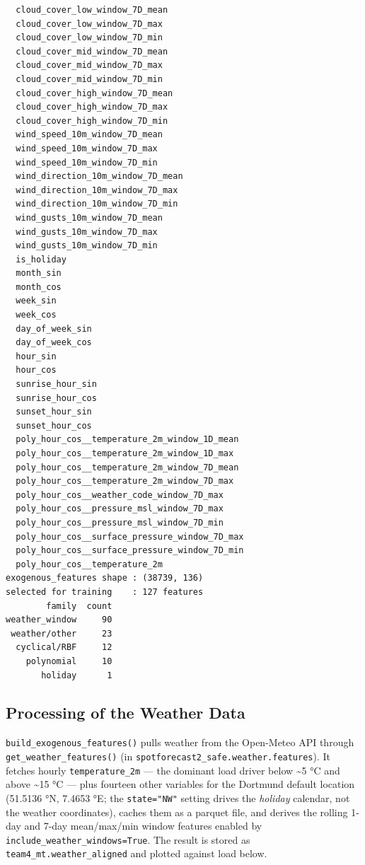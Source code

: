 \documentclass[
  english,
  letterpaper,
]{scrbook}
\begin{document}
\begin{verbatim}
  cloud_cover_low_window_7D_mean
  cloud_cover_low_window_7D_max
  cloud_cover_low_window_7D_min
  cloud_cover_mid_window_7D_mean
  cloud_cover_mid_window_7D_max
  cloud_cover_mid_window_7D_min
  cloud_cover_high_window_7D_mean
  cloud_cover_high_window_7D_max
  cloud_cover_high_window_7D_min
  wind_speed_10m_window_7D_mean
  wind_speed_10m_window_7D_max
  wind_speed_10m_window_7D_min
  wind_direction_10m_window_7D_mean
  wind_direction_10m_window_7D_max
  wind_direction_10m_window_7D_min
  wind_gusts_10m_window_7D_mean
  wind_gusts_10m_window_7D_max
  wind_gusts_10m_window_7D_min
  is_holiday
  month_sin
  month_cos
  week_sin
  week_cos
  day_of_week_sin
  day_of_week_cos
  hour_sin
  hour_cos
  sunrise_hour_sin
  sunrise_hour_cos
  sunset_hour_sin
  sunset_hour_cos
  poly_hour_cos__temperature_2m_window_1D_mean
  poly_hour_cos__temperature_2m_window_1D_max
  poly_hour_cos__temperature_2m_window_7D_mean
  poly_hour_cos__temperature_2m_window_7D_max
  poly_hour_cos__weather_code_window_7D_max
  poly_hour_cos__pressure_msl_window_7D_max
  poly_hour_cos__pressure_msl_window_7D_min
  poly_hour_cos__surface_pressure_window_7D_max
  poly_hour_cos__surface_pressure_window_7D_min
  poly_hour_cos__temperature_2m
exogenous_features shape : (38739, 136)
selected for training    : 127 features
        family  count
weather_window     90
 weather/other     23
  cyclical/RBF     12
    polynomial     10
       holiday      1
\end{verbatim}

\subsection{Processing of the Weather Data}\label{sec-team4-weather}

\texttt{build\_exogenous\_features()} pulls weather from the Open-Meteo
API through \texttt{get\_weather\_features()} (in
\texttt{spotforecast2\_safe.weather.features}). It fetches hourly
\texttt{temperature\_2m} --- the dominant load driver below
\textasciitilde5 °C and above \textasciitilde15 °C --- plus fourteen
other variables for the Dortmund default location (51.5136 °N, 7.4653
°E; the \texttt{state="NW"} setting drives the \emph{holiday} calendar,
not the weather coordinates), caches them as a parquet file, and derives
the rolling 1-day and 7-day mean/max/min window features enabled by
\texttt{include\_weather\_windows=True}. The result is stored as
\texttt{team4\_mt.weather\_aligned} and plotted against load below.
\end{document}
